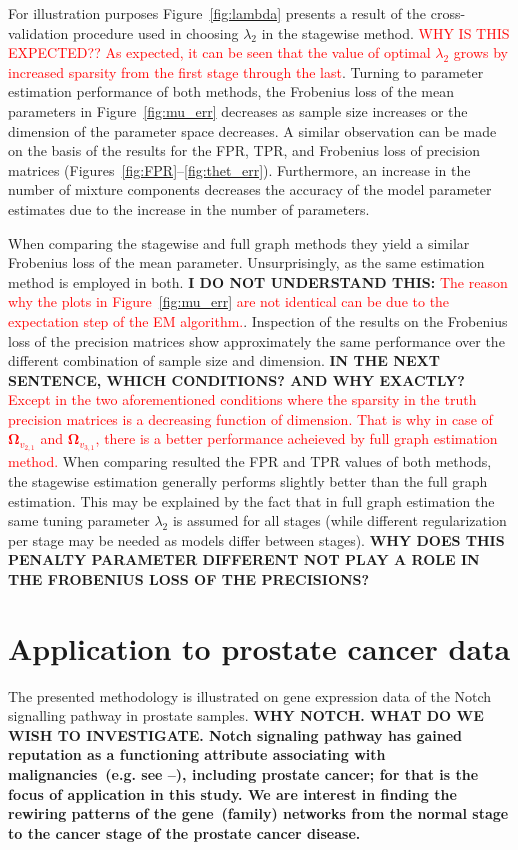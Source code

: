 \documentclass[10pt]{article}
\newcommand{\red}[1]{{\textcolor {red} {#1}}}
\begin{document}
For illustration purposes Figure~\ref{fig:lambda} presents a result of the cross-validation procedure used  in choosing $\lambda_2$ in the stagewise method. \red{WHY IS THIS EXPECTED?? As expected, it can be seen that the value of optimal $\lambda_2$ grows by increased sparsity from the first stage through the last}. Turning to parameter estimation performance of both methods, the Frobenius loss of the mean parameters in Figure~\ref{fig:mu_err} decreases as sample size increases or the dimension of the parameter space decreases. A similar observation can be made on the basis of the results for the FPR, TPR, and Frobenius loss of precision matrices (Figures~\ref{fig:FPR}--\ref{fig:thet_err}). Furthermore, an increase in the number of mixture components decreases the accuracy of the model parameter estimates due to the increase in the number of parameters.


When comparing the stagewise and full graph methods they yield a similar Frobenius loss of the mean parameter. Unsurprisingly, as the same estimation method is employed in both. \textbf{I DO NOT UNDERSTAND THIS:} \red{The reason why the plots in Figure~\ref{fig:mu_err} are not identical can be due to the expectation step of the EM algorithm.}. 
Inspection of the results on the Frobenius loss of the precision matrices show approximately the same performance over the different combination of sample size and dimension. \textbf{IN THE NEXT SENTENCE, WHICH CONDITIONS? AND WHY EXACTLY?} \red{Except in the two aforementioned conditions where the sparsity in the truth precision matrices is a decreasing function of dimension. That is why in case of $\mathbf{\Omega}_{v_{2,1}}$ and $\mathbf{\Omega}_{v_{3,1}}$, there is a better performance acheieved by full graph estimation method.} 
When comparing resulted the FPR and TPR values of both methods, the stagewise estimation generally performs slightly better than the full graph estimation.  This may be explained by the fact that in full graph estimation the same tuning parameter $\lambda_2$ is assumed for all stages (while different regularization per stage may be needed as models differ between stages). \textbf{WHY DOES THIS PENALTY PARAMETER DIFFERENT NOT PLAY A ROLE IN THE FROBENIUS LOSS OF THE PRECISIONS?}




\section{Application to prostate cancer data}\label{application}
The presented methodology is illustrated on gene expression data of the Notch signalling pathway in prostate samples. \textbf{WHY NOTCH. WHAT DO WE WISH TO INVESTIGATE. 
Notch signaling pathway has gained reputation as a functioning attribute associating with malignancies~(e.g. see \citet{leong2006recent}--\citet{espinoza2013notch}), including prostate cancer; for that is the focus of application in this study. We are interest in finding the rewiring patterns of the gene~(family) networks from the normal stage to the cancer stage of the prostate cancer disease. 
}
\end{document}

